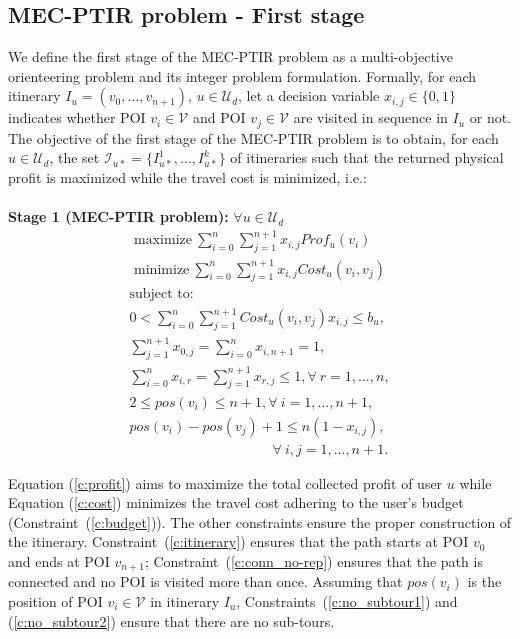 \subsection{MEC-PTIR problem - First stage}
\label{sec:problem-formulation-first-stage}
We define the first stage of the MEC-PTIR problem as a multi-objective orienteering problem and its integer problem formulation. Formally, for each itinerary $I_u=(v_0, \dots, v_{n+1})$, $u \in \mathcal{U}_d$, let a decision variable $x_{i,j} \in \{0, 1\}$ indicates whether POI $v_i \in \mathcal{V}$ and POI $v_j \in \mathcal{V}$ are visited in sequence in $I_u$ or not. 
The objective of the first stage of the MEC-PTIR problem is to obtain, for each $u \in \mathcal{U}_d$, the set $\mathcal{I}_{u*} = \{I_{u*}^{1}, \dots, I_{u*}^{k}\}$ of itineraries such that the returned physical profit is maximized while the travel cost is minimized, i.e.:\\
\\
\textbf{Stage 1 (MEC-PTIR problem):} $\forall u \in \mathcal{U}_d$
\begin{align}
& {\mathrm{maximize}} \ \sum_{i=0}^{n} \sum_{j=1}^{n+1} x_{i,j}Prof_{u}(v_i)\label{c:profit}&\\
& {\mathrm{minimize}} \ \sum_{i=0}^{n} \sum_{j=1}^{n+1} x_{i,j}Cost_{u}(v_i,v_j) \label{c:cost}&
\end{align}
\begin{align}
& \text{subject to:} \nonumber&\\
& 0 < \sum_{i=0}^{n} \sum_{j=1}^{n+1} Cost_{u}(v_i,v_j)x_{i,j} \leq b_u,\label{c:budget}&\\
&\sum_{j=1}^{n+1} x_{0,j} = \sum_{i=0}^{n} x_{i,n+1} = 1,&\label{c:itinerary}\\
&\sum_{i=0}^{n} x_{i,r} = \sum_{j=1}^{n+1} x_{r,j} \leq 1,  \forall \ r = 1, ..., n, &\label{c:conn_no-rep}\\
& 2 \leq pos(v_i) \leq n + 1, \forall \ i = 1, ..., n+1, &\label{c:no_subtour1}\\
& pos(v_i) - pos(v_j) + 1 \leq n(1 - x_{i,j}), \nonumber& \\
& \qquad\qquad\qquad\qquad\qquad \  \forall \ i,j = 1, ..., n+1.\label{c:no_subtour2}
\end{align}

Equation (\ref{c:profit}) aims to maximize the total collected profit of user $u$ while Equation (\ref{c:cost}) minimizes the travel cost adhering to the user's budget (Constraint~(\ref{c:budget})). The other constraints ensure the proper construction of the itinerary. Constraint~(\ref{c:itinerary}) ensures that the path starts at POI $v_0$ and ends at POI $v_{n+1}$; Constraint~(\ref{c:conn_no-rep}) ensures that the path is connected and no POI is visited more than once. Assuming that $pos(v_i)$ is the position of POI $v_i \in \mathcal{V}$ in itinerary $I_u$, Constraints~(\ref{c:no_subtour1}) and (\ref{c:no_subtour2}) ensure that there are no sub-tours.

